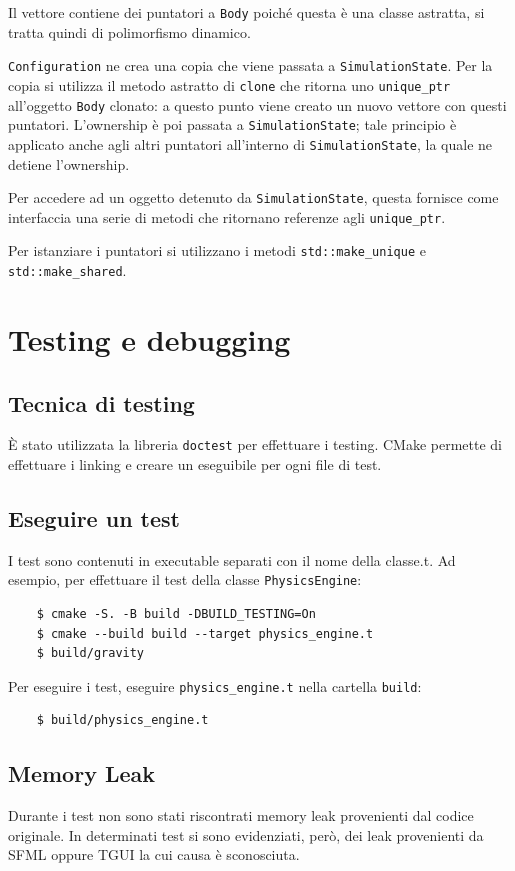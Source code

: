 \documentclass{article}
\begin{document}
Il vettore contiene dei puntatori a \verb|Body| poiché questa è una classe astratta, si tratta quindi di polimorfismo dinamico.

\verb|Configuration| ne crea una copia che viene passata a \verb|SimulationState|. Per la copia si utilizza il metodo astratto di \verb|clone| che ritorna uno \verb|unique_ptr| all'oggetto \verb|Body| clonato: a questo punto viene creato un nuovo vettore con questi puntatori. L'ownership è poi passata a \verb|SimulationState|; tale principio è applicato anche agli altri puntatori all'interno di \verb|SimulationState|, la quale ne detiene l'ownership.

Per accedere ad un oggetto detenuto da \verb|SimulationState|, questa fornisce come interfaccia una serie di metodi che ritornano referenze agli \verb|unique_ptr|.

Per istanziare i puntatori si utilizzano i metodi \verb|std::make_unique| e \verb|std::make_shared|.

\section{Testing e debugging}
\subsection{Tecnica di testing}
È stato utilizzata la libreria \verb|doctest| per effettuare i testing. CMake permette di effettuare i linking e creare un eseguibile per ogni file di test.

\subsection{Eseguire un test}
I test sono contenuti in executable separati con il nome della classe.t. Ad esempio, per effettuare il test della classe \verb|PhysicsEngine|:
\begin{verbatim}
    $ cmake -S. -B build -DBUILD_TESTING=On
    $ cmake --build build --target physics_engine.t
    $ build/gravity
\end{verbatim}

Per eseguire i test, eseguire \verb|physics_engine.t| nella cartella \verb|build|:
\begin{verbatim}
    $ build/physics_engine.t
\end{verbatim}
\subsection{Memory Leak}
Durante i test non sono stati riscontrati memory leak provenienti dal codice originale. In determinati test si sono evidenziati, però, dei leak provenienti da SFML oppure TGUI la cui causa è sconosciuta.
\end{document}
